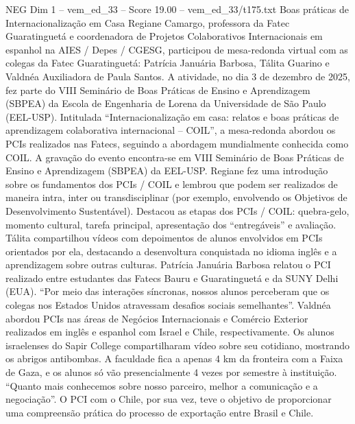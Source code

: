 \begin{textsample}{NEG Dim 1 – vem\_ed\_33 – Score 19.00 – vem\_ed\_33/t175.txt}  \label{ex:f1_neg_113}
Boas práticas de Internacionalização em Casa Regiane Camargo, professora da Fatec Guaratinguetá e coordenadora de Projetos Colaborativos Internacionais em espanhol na AIES / Depes / CGESG, participou de mesa-redonda virtual com as colegas da Fatec Guaratinguetá: Patrícia Januária Barbosa, Tálita Guarino e Valdnéa Auxiliadora de Paula Santos.
A atividade, no dia 3 de dezembro de 2025, fez parte do VIII Seminário de Boas Práticas de Ensino e Aprendizagem (SBPEA) da Escola de Engenharia de Lorena da Universidade de São Paulo (EEL-USP).
Intitulada “Internacionalização em casa: relatos e boas práticas de aprendizagem colaborativa internacional – COIL”, a mesa-redonda abordou os PCIs realizados nas Fatecs, seguindo a abordagem mundialmente conhecida como COIL.
A gravação do evento encontra-se em VIII Seminário de Boas Práticas de Ensino e Aprendizagem (SBPEA) da EEL-USP.
Regiane fez uma introdução sobre os fundamentos dos PCIs / COIL e lembrou que podem ser realizados de maneira intra, inter ou transdisciplinar (por exemplo, envolvendo os Objetivos de Desenvolvimento Sustentável).
Destacou as etapas dos PCIs / COIL: quebra-gelo, momento cultural, tarefa principal, apresentação dos “entregáveis” e avaliação.
Tálita compartilhou vídeos com depoimentos de alunos envolvidos em PCIs orientados por ela, destacando a desenvoltura conquistada no idioma inglês e a aprendizagem sobre outras culturas.
Patrícia Januária Barbosa relatou o PCI realizado entre estudantes das Fatecs Bauru e Guaratinguetá e da SUNY Delhi (EUA). “Por meio das interações síncronas, nossos alunos perceberam que os colegas nos Estados Unidos atravessam desafios sociais semelhantes”.
Valdnéa abordou PCIs nas áreas de Negócios Internacionais e Comércio Exterior realizados em inglês e espanhol com Israel e Chile, respectivamente.
Os alunos israelenses do Sapir College compartilharam vídeo sobre seu cotidiano, mostrando os abrigos antibombas.
A faculdade fica a apenas 4 km da fronteira com a Faixa de Gaza, e os alunos só vão presencialmente 4 vezes por semestre à instituição. “Quanto mais conhecemos sobre nosso parceiro, melhor a comunicação e a negociação”.
O PCI com o Chile, por sua vez, teve o objetivo de proporcionar uma compreensão prática do processo de exportação entre Brasil e Chile.

\end{textsample}
